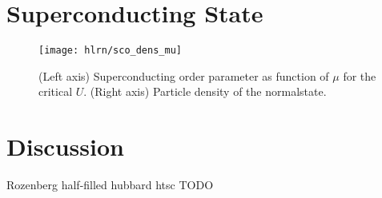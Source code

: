 \documentclass[aps,prb,twocolumn,groupedaddress,amsmath,amssymb]{revtex4-1}
\begin{document}
\section{Superconducting State}
\begin{figure}[th]
  \texttt{[image: hlrn/sco\_dens\_mu]}
  \caption{(Left axis) Superconducting order parameter as function of $\mu$ for the critical $U$. (Right axis) Particle density of the normalstate.}
  \label{fig:scodensmu}
\end{figure}

\section{Discussion}
Rozenberg half-filled hubbard htsc
TODO


\end{document}
